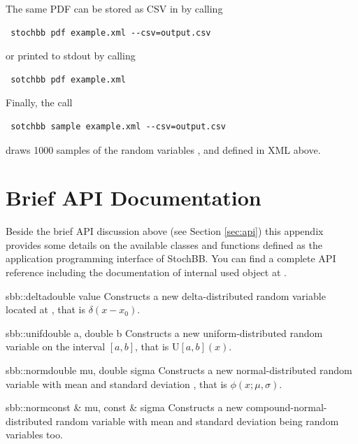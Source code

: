 \documentclass[a4paper, 10pt]{paper}
\begin{document}
The same PDF can be stored as CSV in  by calling
\begin{lstlisting}
 stochbb pdf example.xml --csv=output.csv
\end{lstlisting}
or printed to stdout by calling 
\begin{lstlisting}
 sotchbb pdf example.xml
\end{lstlisting}

Finally, the call
\begin{lstlisting}
 sotchbb sample example.xml --csv=output.csv
\end{lstlisting}
draws 1000 samples of the random variables ,  and  defined in XML above.






\clearpage
\appendix
\section{Brief API Documentation} \label{sec::apidoc}
Beside the brief API discussion above (see Section \ref{sec:api}) this appendix provides some details on the available classes and 
functions defined as the application programming interface of StochBB. You can find a complete API reference including the documentation
of internal used object at \citep{stochbbapi}.

\begin{deffunc}{sbb::delta}{}{double value}	
 Constructs a new delta-distributed random variable located at , that is $\delta(x-x_0)$.
\end{deffunc}

\begin{deffunc}{sbb::unif}{}{double a, double b}	
Constructs a new uniform-distributed random variable on the interval $[a,b]$, that is $\text{U}[a,b](x)$.
\end{deffunc}

\begin{deffunc}{sbb::norm}{}{double mu, double sigma}
Constructs a new normal-distributed random variable with mean  and 
standard deviation  , that is $\phi(x;\mu, \sigma)$.
\end{deffunc}

\begin{deffunc*}{sbb::norm}{}{const \& mu, const \& sigma}
Constructs a new compound-normal-distributed random variable with mean  and 
standard deviation  being random variables too.
\end{deffunc*}
\end{document}
